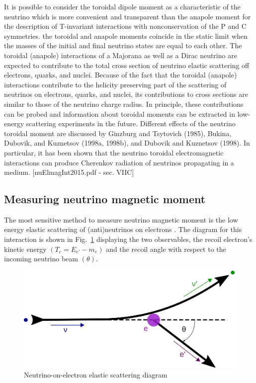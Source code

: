 It is possible to consider  the toroidal dipole moment as a characteristic of the neutrino which is more convenient and transparent than the anapole moment for the description of T-invariant interactions with nonconservation of the P and C symmetries. the toroidal and anapole moments coincide in the static limit when the masses of the initial and final neutrino states are equal to each other. The toroidal (anapole) interactions of a Majorana as well as a Dirac neutrino are expected to contribute to the total cross section of neutrino elastic scattering off electrons, quarks, and nuclei. Because of the fact that the toroidal (anapole) interactions contribute to the helicity preserving part of the scattering of neutrinos on electrons, quarks, and nuclei, its contributions to cross sections are similar to those of the neutrino charge radius. In principle, these contributions can be probed and information about toroidal moments can be extracted in low-energy scattering experiments in the future. Different effects of the neutrino toroidal moment are discussed by Ginzburg and Tsytovich (1985), Bukina, Dubovik, and Kuznetsov (1998a, 1998b), and Dubovik and Kuznetsov (1998). In particular, it has been shown that the neutrino toroidal electromagnetic interactions can produce Cherenkov radiation of neutrinos propagating in a medium. [nuElmagInt2015.pdf - sec. VIIC]


\subsection{Measuring neutrino magnetic moment}\label{sec:MeasuringNuMM}
The most sensitive method to measure neutrino magnetic moment is the low energy elastic scattering of (anti)neutrinos on electrons \cite{nuElmagInt2015.pdf}. The diagram for this interaction is shown in Fig.~\ref{fig:NuoneDiagram} displaying the two observables, the recoil electron's kinetic energy $\left(T_e=E_{e\prime}-m_e\right)$ and the recoil angle with respect to the incoming neutrino beam $\left(\theta\right)$.
\begin{figure}[hbtp]
\centering
\includegraphics[width=0.55\linewidth]{Plots/NuMM/NuoneInteraction.png}
\caption{Neutrino-on-electron elastic scattering diagram}
\label{fig:NuoneDiagram}
\end{figure}

